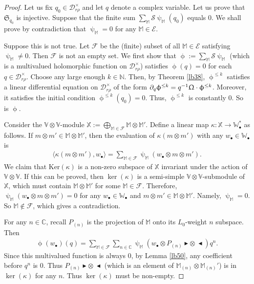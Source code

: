 \documentclass[12pt,a4paper,notitlepage]{article}
\theoremstyle{definition}
\theoremstyle{plain}
\newcommand{\fk}{\mathfrak}
\newcommand{\mc}{\mathcal}
\newcommand{\bk}[1]{\langle {#1}\rangle}
\newcommand{\mbb}{\mathbb}
\newcommand{\blt}{\bullet}
\newcommand{\Vbb}{\mathbb V}
\newcommand{\Wbb}{\mathbb W}
\newcommand{\Mbb}{\mathbb M}
\newcommand{\Cbb}{\mathbb C}
\newcommand{\Nbb}{\mathbb N}
\newcommand{\btl}{\blacktriangleleft}
\newcommand{\btr}{\blacktriangleright}
\newcommand{\Ker}{\mathrm{Ker}}
\numberwithin{equation}{section}
\begin{document}
\begin{proof}
	Let us fix $q_0\in\mc D_{r\rho}^\times$ and let $q$ denote a complex variable. Let us prove that $\fk S_{q_0}$ is injective. Suppose that the finite sum $\sum_\Mbb\mc S\uppsi_\Mbb(q_0)$ equals $0$. We shall prove by contradiction that $\uppsi_\Mbb=0$ for any $\Mbb\in\mc E$. 
	
	Suppose this is not true. Let $\mc F$ be the (finite) subset of all $\Mbb\in\mc E$ satisfying $\uppsi_\Mbb\neq0$. Then $\mc F$ is not an empty set. 	We first show that $\upphi:=\sum_\Mbb\mc S\uppsi_\Mbb$ (which is a multivalued holomorphic function on $\mc D_{r\rho}^\times$) satisfies $\upphi(q)=0$ for each $q\in\mc D_{r\rho}^\times$. Choose any large enough  $k\in\Nbb$. Then, by Theorem \ref{lb38},  $\upphi^{\leq k}$ satisfies a linear differential equation on $\mc D_{r\rho}^\times$ of the form $\partial_q\upphi^{\leq k}=q^{-1}\Upomega\cdot \upphi^{\leq k}$. Moreover, it satisfies the initial condition $\upphi^{\leq k}(q_0)=0$. Thus, $\upphi^{\leq k}$ is constantly $0$. So is $\upphi$.
	
	Consider the $\Vbb\otimes\Vbb$-module $\mbb X:=\bigoplus_{\Mbb\in\mc F}\Mbb\otimes\Mbb'$. Define a linear map $\kappa:\mbb X\rightarrow \Wbb_\blt^*$ as follows. If $m\otimes m'\in\Mbb\otimes\Mbb'$, then the evaluation of $\kappa(m\otimes m')$ with any $w_\blt\in\Wbb_\blt$ is
	\begin{align*}
	\bk{\kappa(m\otimes m'),w_\blt}=\sum_{\Mbb\in\mc F}\uppsi_\Mbb(w_\blt\otimes m\otimes m').
	\end{align*}
	We claim that $\Ker(\kappa)$ is a non-zero subspace of $\mbb X$ invariant under the action of $\Vbb\otimes \Vbb$. If this can be proved, then $\ker(\kappa)$ is a semi-simple $\Vbb\otimes\Vbb$-submodule of $\mbb X$, which must contain $\Mbb\otimes\Mbb'$ for some $\Mbb\in\mc F$. Therefore, $\uppsi_\Mbb(w_\blt\otimes m\otimes m')=0$ for any $w_\blt\in\Wbb_\blt$ and $m\otimes m'\in\Mbb\otimes\Mbb'$. Namely, $\uppsi_\Mbb=0$. So $\Mbb\notin\mc F$, which gives a contradiction. 
	
	For any $n\in\Cbb$, recall $P_{(n)}$ is the projection of $\Mbb$ onto its $L_0$-weight $n$ subspace. Then 
	\begin{align*}
	\upphi(w_\blt)(q)=\sum_{\Mbb\in\mc F}\sum_{n\in\Cbb} \uppsi_\Mbb(w_\blt\otimes P_{(n)}\btr\otimes~\btl)q^n.
	\end{align*}
	Since this multivalued function is always $0$, by Lemma \ref{lb50}, any coefficient before $q^n$ is $0$. Thus $P_{(n)}\btr\otimes~\btl$ (which is an element of $\Mbb_{(n)}\otimes\Mbb_{(n)}'$) is in $\ker(\kappa)$ for any $n$. Thus $\ker(\kappa)$ must be non-empty.
	

\end{proof}
\end{document}

